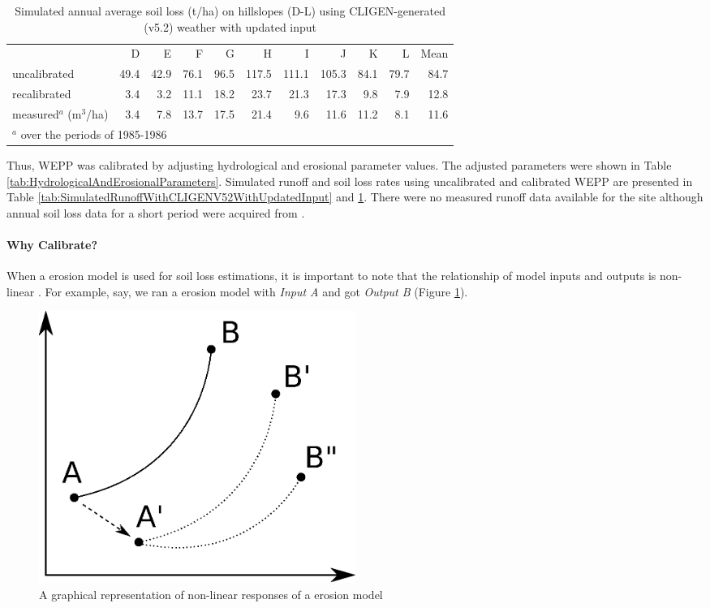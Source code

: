 \begin{table}[htbp]
  \centering
  \caption[Simulated annual average soil loss on hillslopes using
CLIGEN-generated weather with updated input]{Simulated annual average soil loss
(t/ha) on hillslopes (D-L) using CLIGEN-generated (v5.2) weather with updated
input}
  \label{tab:SimulatedSoilLossWithCLIGENV52WithUpdatedInput}
  \footnotesize
    \begin{tabular}{lrrrrrrrrrr}
      \toprule
      & D & E & F & G & H & I & J & K & L & Mean\\
      \cmidrule{2-11}
      uncalibrated & 49.4 & 42.9 & 76.1 & 96.5 & 117.5 & 111.1
& 105.3 & 84.1 & 79.7 & 84.7\\
      recalibrated & 3.4 & 3.2 & 11.1 & 18.2 & 23.7 & 21.3 &
17.3 & 9.8 & 7.9 & 12.8\\
      measured$^a$ (m$^3$/ha) & 3.4 & 7.8 & 13.7 & 17.5 & 21.4
& 9.6 & 11.6 & 11.2 & 8.1 & 11.6\\
      \bottomrule
      \multicolumn{8}{l}{\footnotesize $^a$ over the periods
of 1985-1986 \citep[From][]{favis-mortlock1998-141}}
    \end{tabular}
\end{table}

Thus, WEPP was calibrated by adjusting hydrological and
erosional parameter values. The adjusted parameters were shown in Table
\ref{tab:HydrologicalAndErosionalParameters}. Simulated runoff and soil
loss rates using uncalibrated and calibrated WEPP are presented in Table
\ref{tab:SimulatedRunoffWithCLIGENV52WithUpdatedInput} and
\ref{tab:SimulatedSoilLossWithCLIGENV52WithUpdatedInput}. There were no measured
runoff data available for the site although annual soil loss data for a short
period were acquired from \citet{favis-mortlock1998-141}.

\paragraph{Why Calibrate?} When a erosion model
is used for soil loss estimations, it is important to note that the relationship
of model inputs and outputs is non-linear
\citep{favis-mortlock1995-365,jetten1999-521}. For example, say, we ran a
erosion model with \emph{Input A} and got \emph{Output B}
(Figure \ref{fig:calibration}).

\begin{figure}[htbp]
  \centering
    \includegraphics[width=0.5\textwidth]{./img/calibration}
  \caption{A graphical representation of non-linear responses of a erosion
model}
  \label{fig:calibration}
\end{figure}

